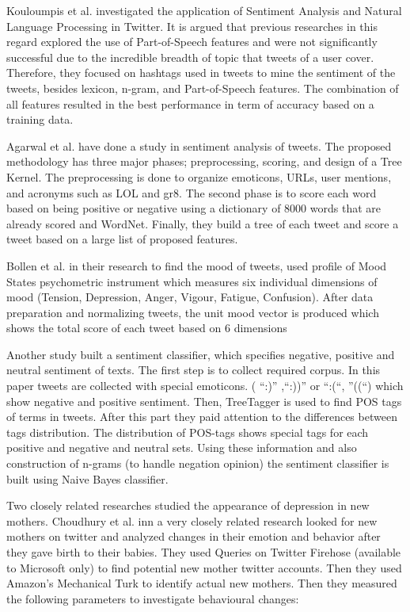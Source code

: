 \documentclass{article}
\begin{document}
Kouloumpis et al. \cite{ref17} investigated the application of Sentiment Analysis and Natural Language Processing in Twitter. It is argued that previous researches in this regard explored the use of Part-of-Speech features and were not significantly successful due to the incredible breadth of topic that tweets of a user cover. Therefore, they focused on hashtags used in tweets to mine the sentiment of the tweets, besides lexicon, n-gram, and Part-of-Speech features. The combination of all features resulted in the best performance in term of accuracy based on a training data.

Agarwal et al. \cite{ref15} have done a study in sentiment analysis of tweets. The proposed methodology has three major phases; preprocessing, scoring, and design of a Tree Kernel. The preprocessing is done to organize emoticons, URLs, user mentions, and acronyms such as LOL and gr8. The second phase is to score each word based on being positive or negative using a dictionary of 8000 words that are already scored and WordNet. Finally, they build a tree of each tweet and score a tweet based on a large list of proposed features.

Bollen et al. \cite{ref18} in their research to find the mood of tweets, used profile of Mood States psychometric instrument which measures six individual dimensions of mood (Tension, Depression, Anger, Vigour, Fatigue, Confusion). After data preparation and normalizing tweets, the unit mood vector is produced which shows the total score of each tweet based on 6 dimensions

Another study \cite{ref19} built a sentiment classifier, which specifies negative, positive and neutral sentiment of texts. The first step is to collect required corpus. In this paper tweets are collected with special emoticons. ( “:)” ,“:))” or “:(“, ”((“) which show negative and positive sentiment. Then, TreeTagger is used to find POS tags of terms in tweets. After this part they paid attention to the differences between tags distribution. The distribution of POS-tags shows special tags for each positive and negative and neutral sets. Using these information and also construction of n-grams (to handle negation opinion) the sentiment classifier is built using Naive Bayes classifier.

Two closely related researches studied the appearance of depression in new mothers. Choudhury et al. inn a very closely related research looked for new mothers on twitter and analyzed changes in their emotion and behavior after they gave birth to their babies. They used Queries on Twitter Firehose (available to Microsoft only) to find potential new mother twitter accounts. Then they used Amazon's Mechanical Turk to identify actual new mothers. Then they measured the following parameters to investigate behavioural changes: 
\end{document}
